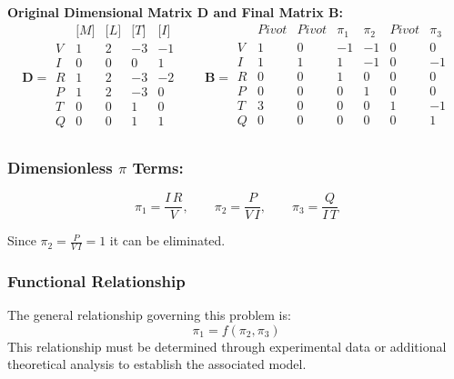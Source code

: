 \textbf{Original Dimensional Matrix $\mathbf{D}$ and Final Matrix $\mathbf{B}$:}
\begin{equation}\mathbf{D} = \begin{array}{r|rrrr}
& \text{[}M\text{]} & \text{[}L\text{]} & \text{[}T\text{]} & \text{[}I\text{]} \\
\hline
V & 1 & 2 & -3 & -1 \\
I & 0 & 0 & 0 & 1 \\
R & 1 & 2 & -3 & -2 \\
P & 1 & 2 & -3 & 0 \\
T & 0 & 0 & 1 & 0 \\
Q & 0 & 0 & 1 & 1 \\
\end{array}
\qquad
\mathbf{B} = \begin{array}{r|rrrrrr}
& Pivot & Pivot & \pi_{1} & \pi_{2} & Pivot & \pi_{3} \\
\hline
V & 1 & 0 & -1 & -1 & 0 & 0 \\
I & 1 & 1 & 1 & -1 & 0 & -1 \\
R & 0 & 0 & 1 & 0 & 0 & 0 \\
P & 0 & 0 & 0 & 1 & 0 & 0 \\
T & 3 & 0 & 0 & 0 & 1 & -1 \\
Q & 0 & 0 & 0 & 0 & 0 & 1 \\
\end{array}\end{equation}

\subsubsection*{Dimensionless $\pi$ Terms:}
\begin{equation}
\pi_{1} = \frac{I \, R}{V}, \qquad
\pi_{2} = \frac{P}{V \, I}, \qquad
\pi_{3} = \frac{Q}{I \, T}
\end{equation}

Since $\pi_{2} = \frac{P}{V \, I}=1$ it can be eliminated.

\subsubsection*{Functional Relationship}
The general relationship governing this problem is:
\begin{equation}
\pi_1 = f(\pi_2,\pi_3)
\end{equation}
This relationship must be determined through experimental data or additional theoretical analysis to establish the associated model.

